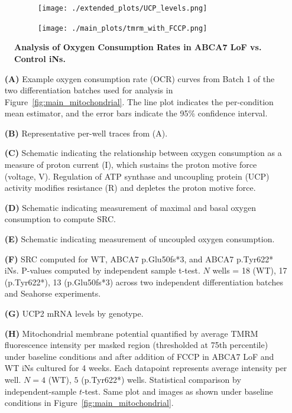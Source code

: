 \documentclass[12pt]{article}
\begin{document}
\begin{figure}[H]
    \begin{subfigure}[t]{0.3\textwidth}
        \caption{}
        \texttt{[image: ./extended\_plots/UCP\_levels.png]}        
    \end{subfigure} 
    \par
    \centering
    \begin{subfigure}[t]{0.65\textwidth}
        \caption{}
        \texttt{[image: ./main\_plots/tmrm\_with\_FCCP.png]}        
    \end{subfigure} 
    \caption{
         \textbf{Analysis of Oxygen Consumption Rates in ABCA7 LoF vs. Control iNs.}\\
     }
     \label{fig:oxygen_consumption_rates_iPSC_neurons}
 \end{figure}
 \begin{itemize}
    \item[\textbf{(A)}] Example oxygen consumption rate (OCR) curves from Batch 1 of the two differentiation batches used for analysis in Figure~\ref{fig:main_mitochondrial}. The line plot indicates the per-condition mean estimator, and the error bars indicate the 95\% confidence interval. 
    \item[\textbf{(B)}] Representative per-well traces from (A). 
    \item[\textbf{(C)}] Schematic indicating the relationship between oxygen consumption as a measure of proton current (I), which sustains the proton motive force (voltage, V). Regulation of ATP synthase and uncoupling protein (UCP) activity modifies resistance (R) and depletes the proton motive force.
    \item[\textbf{(D)}] Schematic indicating measurement of maximal and basal oxygen consumption to compute SRC.
    \item[\textbf{(E)}] Schematic indicating measurement of uncoupled oxygen consumption.
    \item[\textbf{(F)}] SRC computed for WT, ABCA7 p.Glu50fs*3, and ABCA7 p.Tyr622* iNs. P-values computed by independent sample t-test. $N$ wells = 18 (WT), 17 (p.Tyr622*), 13 (p.Glu50fs*3) across two independent differentiation batches and Seahorse experiments. 
\item[\textbf{(G)}] UCP2 mRNA levels by genotype. 
    \item[\textbf{(H)}] Mitochondrial membrane potential quantified by average TMRM fluorescence intensity per masked region (thresholded at 75th percentile) under baseline conditions and after addition of FCCP in ABCA7 LoF and WT iNs cultured for 4 weeks. Each datapoint represents average intensity per well. $N=4$ (WT), $5$ (p.Tyr622*) wells. Statistical comparison by independent-sample $t$-test. Same plot and images as shown under baseline conditions in Figure~\ref{fig:main_mitochondrial}.
 \end{itemize} \clearpage
\end{document}

